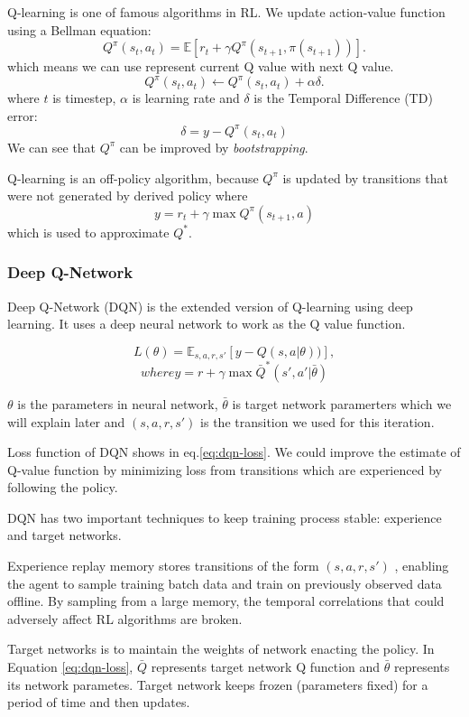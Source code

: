 \documentclass[11pt,twocolumn]{jarticle} %
\begin{document}
Q-learning is one of famous algorithms in RL. We update action-value function using a Bellman equation: 
\begin{equation}
Q^\pi(s_t, a_t) = \mathbb{E}[r_{t} + \gamma Q^\pi(s_{t+1}, \pi(s_{t+1}))].  
\end{equation}
which means we can use represent current Q value with next Q value.
\begin{equation}
Q^\pi(s_t, a_t) \leftarrow Q^\pi(s_t, a_t) + \alpha\delta.  
\end{equation}
where $t$ is timestep, $\alpha$ is learning rate and $\delta$ is the Temporal Difference (TD) error:
\begin{equation}
\delta = y - Q^\pi(s_t, a_t)
\end{equation}
We can see that $Q^\pi$ can be improved by \textsl{bootstrapping}.\par 
Q-learning is an off-policy algorithm, because $Q^\pi$ is updated by transitions that were not generated by derived policy where 
\begin{equation}
y = r_t + \gamma\max Q^\pi(s_{t+1}, a)
\end{equation}
which is used to approximate $Q^*$.

\subsubsection{Deep Q-Network\cite{dqn}}

Deep Q-Network (DQN) is the extended version of Q-learning using deep learning. It uses a deep neural network to work as the Q value function. 

\begin{equation} \label{eq:dqn-loss}
L(\theta) = \mathbb{E}_{s,a,r,s'}[y - Q(s, a|\theta))],  
\end{equation}
$$where y = r + \gamma\max \bar{Q}^*(s', a'|\bar{\theta})$$

$\theta$ is the parameters in neural network, $\bar{\theta}$ is target network paramerters which we will explain later and $(s,a,r,s')$ is the transition we used for this iteration. \par

Loss function of DQN shows in eq.\ref{eq:dqn-loss}. We could improve the estimate of Q-value function by minimizing loss from transitions which are experienced by following the policy. \par
DQN has two important techniques to keep training process stable: experience and target networks.\par
Experience replay \cite{replay} memory stores transitions of the form $(s,a,r,s')$ , enabling the agent to sample training batch data and train on previously observed data offline. By sampling from a large memory, the temporal correlations that could adversely affect RL algorithms are broken. \par
Target networks \cite{qlearning} is to maintain the weights of network enacting the policy. In Equation \ref{eq:dqn-loss}, $\bar{Q}$ represents target network Q function and $\bar{\theta}$ represents its network parametes. Target network keeps frozen (parameters fixed) for a period of time and then updates. \par
\end{document}
